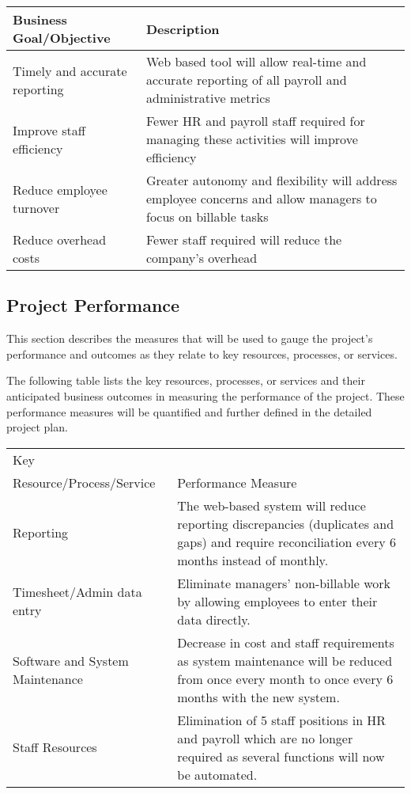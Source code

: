 \documentclass[11pt]{article}
\begin{document}
\begin{center}
\begin{tabular}{ll}
Business Goal/Objective & Description\\
\hline
Timely and accurate reporting & Web based tool will allow real-time and accurate reporting of all payroll and administrative metrics\\
Improve staff efficiency & Fewer HR and payroll staff required for managing these activities will improve efficiency\\
Reduce employee turnover & Greater autonomy and flexibility will address employee concerns and allow managers to focus on billable tasks\\
Reduce overhead costs & Fewer staff required will reduce the company’s overhead\\
\end{tabular}
\end{center}

\subsection{Project Performance}
\label{sec:orgc378cee}
This section describes the measures that will be used to gauge the project’s performance and outcomes as they relate to key resources, processes, or services.

The following table lists the key resources, processes, or services and their anticipated business outcomes in measuring the performance of the project. These performance measures will be quantified and further defined in the detailed project plan.

\begin{center}
\begin{tabular}{ll}
Key & \\
Resource/Process/Service & Performance Measure\\
\hline
Reporting & The web-based system will reduce reporting discrepancies (duplicates and gaps) and require reconciliation every 6 months instead of monthly.\\
Timesheet/Admin data entry & Eliminate managers’ non-billable work by allowing employees to enter their data directly.\\
Software and System Maintenance & Decrease in cost and staff requirements as system maintenance will be reduced from once every month to once every 6 months with the new system.\\
Staff Resources & Elimination of 5 staff positions in HR and payroll which are no longer required as several functions will now be automated.\\
\end{tabular}
\end{center}
\end{document}

